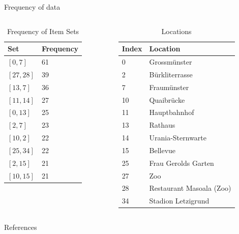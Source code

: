 \documentclass{beamer}
\begin{document}
\begin{frame}{Frequency of data}
  \begin{columns}
    \begin{column}{0.5\columnwidth}
      \begin{table}
        \centering
        \caption{Frequency of Item Sets}
        \begin{tabular}{ll}
          \hline
          Set & Frequency \\
          \hline
          $[0, 7]$ & 61\\
          $[27, 28]$ & 39\\
          $[13, 7]$ & 36\\
          $[11, 14]$ & 27\\
          $[0, 13]$ & 25\\
          $[2, 7]$ & 23\\
          $[10, 2]$ & 22\\
          $[25, 34]$ & 22\\
          $[2, 15]$ & 21\\
          $[10, 15]$ & 21\\
          \hline
        \end{tabular}
      \end{table}
    \end{column}
    
    \begin{column}{0.5\columnwidth}
      \begin{table}
        \centering
        \caption{Locations}
        \begin{tabular}{ll}
          \hline
          Index & Location \\
          \hline
          0 & Grossmünster \\
          2 & Bürkliterrasse \\
          7 & Fraumünster \\
          10 & Quaibrücke \\
          11 & Hauptbahnhof \\
          13 & Rathaus \\
          14 & Urania-Sternwarte \\
          15 & Bellevue \\
          25 & Frau Gerolds Garten \\
          27 & Zoo \\
          28 & Restaurant Masoala (Zoo) \\
          34 & Stadion Letzigrund \\
          \hline
        \end{tabular}
      \end{table}
    \end{column}
  \end{columns}
\end{frame}


\begin{frame}{References}
  
  
\end{frame}
\end{document}
